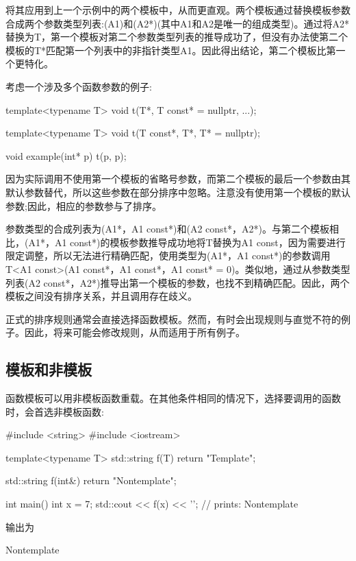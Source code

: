 将其应用到上一个示例中的两个模板中，从而更直观。两个模板通过替换模板参数合成两个参数类型列表:(A1)和(A2*)(其中A1和A2是唯一的组成类型)。通过将A2*替换为T，第一个模板对第二个参数类型列表的推导成功了，但没有办法使第二个模板的T*匹配第一个列表中的非指针类型A1。因此得出结论，第二个模板比第一个更特化。

考虑一个涉及多个函数参数的例子:

\begin{cpp}
template<typename T>
void t(T*, T const* = nullptr, ...);

template<typename T>
void t(T const*, T*, T* = nullptr);

void example(int* p)
{
	t(p, p);
}
\end{cpp}

因为实际调用不使用第一个模板的省略号参数，而第二个模板的最后一个参数由其默认参数替代，所以这些参数在部分排序中忽略。注意没有使用第一个模板的默认参数;因此，相应的参数参与了排序。

参数类型的合成列表为(A1*，A1 const*)和(A2 const*，A2*)。与第二个模板相比，(A1*，A1 const*)的模板参数推导成功地将T替换为A1 const，因为需要进行限定调整，所以无法进行精确匹配，使用类型为(A1*，A1 const*)的参数调用T<A1 const>(A1 const*，A1 const*，A1 const* = 0)。类似地，通过从参数类型列表(A2 const*，A2*)推导出第一个模板的参数，也找不到精确匹配。因此，两个模板之间没有排序关系，并且调用存在歧义。

正式的排序规则通常会直接选择函数模板。然而，有时会出现规则与直觉不符的例子。因此，将来可能会修改规则，从而适用于所有例子。

\subsection{模板和非模板}

函数模板可以用非模板函数重载。在其他条件相同的情况下，选择要调用的函数时，会首选非模板函数:

\begin{cpp}
#include <string>
#include <iostream>

template<typename T>
std::string f(T)
{
	return "Template";
}

std::string f(int&)
{
	return "Nontemplate";
}

int main()
{
	int x = 7;
	std::cout << f(x) << ’\n’; // prints: Nontemplate
}
\end{cpp}

输出为

\begin{shell}
Nontemplate
\end{shell}

